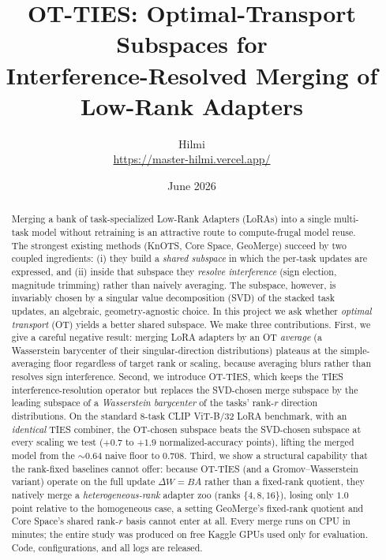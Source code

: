 \documentclass[11pt]{article}
\title{\textbf{OT-TIES: Optimal-Transport Subspaces for\\
Interference-Resolved Merging of Low-Rank Adapters}}
\author{
Hilmi\\
\url{https://master-hilmi.vercel.app/}
}
\date{June 2026}
\newcommand{\dW}{\Delta W}
\newcommand{\otties}{\textsc{OT-TIES}}
\begin{document}
\maketitle

\begin{abstract}
Merging a bank of task-specialized Low-Rank Adapters (LoRAs) into a single multi-task model without
retraining is an attractive route to compute-frugal model reuse. The strongest existing methods
(KnOTS, Core Space, GeoMerge) succeed by two coupled ingredients: (i) they build a \emph{shared
subspace} in which the per-task updates are expressed, and (ii) inside that subspace they
\emph{resolve interference} (sign election, magnitude trimming) rather than naively averaging.
The subspace, however, is invariably chosen by a singular value decomposition (SVD) of the stacked
task updates, an algebraic, geometry-agnostic choice. In this project we ask whether
\emph{optimal transport} (OT) yields a better shared subspace. We make three contributions.
First, we give a careful negative result: merging LoRA adapters by an OT \emph{average}
(a Wasserstein barycenter of their singular-direction distributions) plateaus at the
simple-averaging floor regardless of target rank or scaling, because averaging blurs rather than
resolves sign interference. Second, we introduce \otties{}, which keeps the TIES interference-resolution
operator but replaces the SVD-chosen merge subspace by the leading subspace of a \emph{Wasserstein
barycenter} of the tasks' rank-$r$ direction distributions. On the standard $8$-task CLIP ViT-B/32
LoRA benchmark, with an \emph{identical} TIES combiner, the OT-chosen subspace beats the SVD-chosen
subspace at every scaling we test ($+0.7$ to $+1.9$ normalized-accuracy points), lifting the merged
model from the $\sim\!0.64$ naive floor to $0.708$. Third, we show a structural capability that the
rank-fixed baselines cannot offer: because \otties{} (and a Gromov--Wasserstein variant) operate on
the full update $\dW=BA$ rather than a fixed-rank quotient, they natively merge a
\emph{heterogeneous-rank} adapter zoo (ranks $\{4,8,16\}$), losing only $1.0$ point relative to the
homogeneous case, a setting GeoMerge's fixed-rank quotient and Core Space's shared rank-$r$ basis
cannot enter at all. Every merge runs on CPU in minutes; the entire study was produced on free
Kaggle GPUs used only for evaluation. Code, configurations, and all logs are released.
\end{abstract}

\tableofcontents
\newpage
\end{document}
